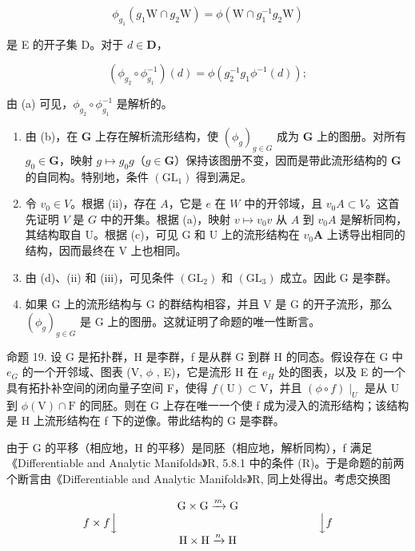 \[
\phi_ {g _ {1}} (g _ {1} \mathrm{W} \cap g _ {2} \mathrm{W}) = \phi (\mathrm{W} \cap g _ {1} ^ {- 1} g _ {2} \mathrm{W})
\]

是 E 的开子集 D。对于 \(d \in \mathbf{D}\)，

\[
\left(\phi_ {g _ {2}} \circ \phi_ {g _ {1}} ^ {- 1}\right) (d) = \phi \left(g _ {2} ^ {- 1} g _ {1} \phi^ {- 1} (d)\right);
\]

由 (a) 可见，\(\phi_{g_2} \circ \phi_{g_1}^{-1}\) 是解析的。

\begin{enumerate}
\def\labelenumi{(\alph{enumi})}
\setcounter{enumi}{2}
\item
  由 (b)，在 \(\mathbf{G}\) 上存在解析流形结构，使 \((\phi_g)_{g\in G}\) 成为 \(\mathbf{G}\) 上的图册。对所有 \(g_0\in \mathbf{G}\)，映射 \(g\mapsto g_0g\)（\(g\in \mathbf{G}\)）保持该图册不变，因而是带此流形结构的 \(\mathbf{G}\) 的自同构。特别地，条件 \((\mathrm{GL}_1)\) 得到满足。
\item
  令 \(v_{0} \in V\)。根据 (ii)，存在 \(A\)，它是 \(e\) 在 \(W\) 中的开邻域，且 \(v_{0}A \subset V\)。这首先证明 \(V\) 是 \(G\) 中的开集。根据 (a)，映射 \(v \mapsto v_{0}v\) 从 \(A\) 到 \(v_{0}A\) 是解析同构，其结构取自 U。根据 (c)，可见 G 和 U 上的流形结构在 \(v_{0}\mathbf{A}\) 上诱导出相同的结构，因而最终在 V 上也相同。
\item
  由 (d)、(ii) 和 (iii)，可见条件 \((\mathrm{GL}_2)\) 和 \((\mathrm{GL}_3)\) 成立。因此 G 是李群。
\item
  如果 G 上的流形结构与 G 的群结构相容，并且 V 是 G 的开子流形，那么 \((\phi_{g})_{g\in G}\) 是 G 上的图册。这就证明了命题的唯一性断言。
\end{enumerate}

命题 19. 设 G 是拓扑群，H 是李群，f 是从群 G 到群 H 的同态。假设存在 G 中 \(e_{G}\) 的一个开邻域、图表 (V, \(\phi\) , E)，它是流形 H 在 \(e_{H}\) 处的图表，以及 E 的一个具有拓扑补空间的闭向量子空间 F，使得 \(f(\mathrm{U}) \subset \mathrm{V}\)，并且 \((\phi \circ f)\mid_U\) 是从 U 到 \(\phi(\mathrm{V}) \cap \mathrm{F}\) 的同胚。则在 G 上存在唯一一个使 f 成为浸入的流形结构；该结构是 H 上流形结构在 f 下的逆像。带此结构的 G 是李群。

由于 G 的平移（相应地，H 的平移）是同胚（相应地，解析同构），f 满足《Differentiable and Analytic Manifolds》R, 5.8.1 中的条件 (R)。于是命题的前两个断言由《Differentiable and Analytic Manifolds》R, 同上处得出。考虑交换图

\[
\begin{array}{c} \mathrm{G} \times \mathrm{G} \xrightarrow {m} \mathrm{G} \\ f \times f \Big \downarrow \qquad \qquad \qquad \qquad \qquad \qquad \qquad \qquad \qquad \Big \downarrow f \\ \mathrm{H} \times \mathrm{H} \xrightarrow {n} \mathrm{H} \end{array}
\]

